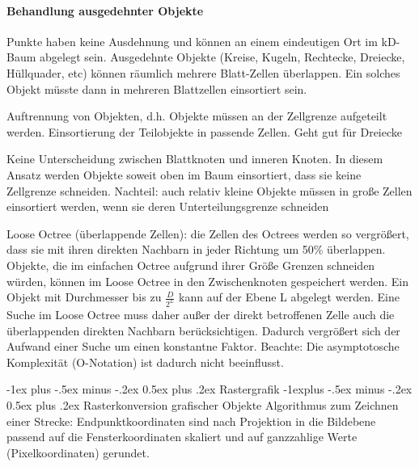 \documentclass[landscape]{article}
\makeatletter
\renewcommand{\section}{\@startsection{section}{1}{0mm}%
                                {-1ex plus -.5ex minus -.2ex}%
                                {0.5ex plus .2ex}%
                                {\normalfont\large\bfseries}}
\renewcommand{\subsection}{\@startsection{subsection}{2}{0mm}%
                                {-1explus -.5ex minus -.2ex}%
                                {0.5ex plus .2ex}%
                                {\normalfont\normalsize\bfseries}}
\makeatother
\begin{document}
\begin{multicols}{3}
  \paragraph*{Behandlung ausgedehnter Objekte}
  Punkte haben keine Ausdehnung und können an einem eindeutigen Ort im kD-Baum abgelegt sein. Ausgedehnte Objekte (Kreise, Kugeln, Rechtecke, Dreiecke, Hüllquader, etc) können räumlich mehrere Blatt-Zellen überlappen. Ein solches Objekt müsste dann in mehreren Blattzellen einsortiert sein.
  \begin{enumerate*}
    \item Auftrennung von Objekten, d.h. Objekte müssen an der Zellgrenze aufgeteilt werden. Einsortierung der Teilobjekte in passende Zellen. Geht gut für Dreiecke
    \item Keine Unterscheidung zwischen Blattknoten und inneren Knoten. In diesem Ansatz werden Objekte soweit oben im Baum einsortiert, dass sie keine Zellgrenze schneiden. Nachteil: auch relativ kleine Objekte müssen in große Zellen einsortiert werden, wenn sie deren Unterteilungsgrenze schneiden
    \item Loose Octree (überlappende Zellen): die Zellen des Octrees werden so vergrößert, dass sie mit ihren direkten Nachbarn in jeder Richtung um 50\% überlappen. Objekte, die im einfachen Octree aufgrund ihrer Größe Grenzen schneiden würden, können im Loose Octree in den Zwischenknoten gespeichert werden. Ein Objekt mit Durchmesser bis zu $\frac{D}{2^L}$ kann auf der Ebene L abgelegt werden. Eine Suche im Loose Octree muss daher außer der direkt betroffenen Zelle auch die überlappenden direkten Nachbarn berücksichtigen. Dadurch vergrößert sich der Aufwand einer Suche um einen konstantne Faktor. Beachte: Die asymptotosche Komplexität (O-Notation) ist dadurch nicht beeinflusst.
  \end{enumerate*}
  
  \section{Rastergrafik}
  \subsection{ Rasterkonversion grafischer Objekte}
  Algorithmus zum Zeichnen einer Strecke: Endpunktkoordinaten sind nach Projektion in die Bildebene passend auf die Fensterkoordinaten skaliert und auf ganzzahlige Werte (Pixelkoordinaten) gerundet.
  

\end{multicols}
\end{document}
